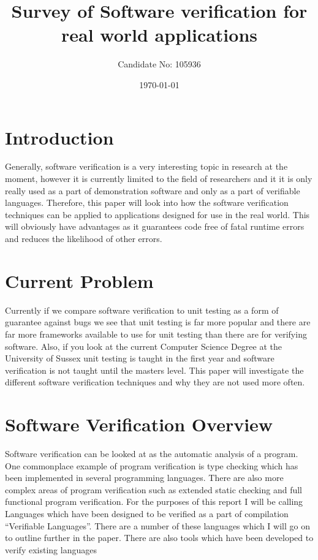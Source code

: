 \documentclass[a4paper,12pt]{scrartcl}
\title{Survey of Software verification for real world applications}
\author{Candidate No: 105936}
\date{\today}
\begin{document}
	
	\begin{titlepage}
		\maketitle
	\end{titlepage}
	
	\tableofcontents
	\newpage
	\section{Introduction}
	{
		Generally, software verification is a very interesting topic in research at the moment, however it is currently limited to the field of researchers and it it is only really used as a part of demonstration software and only as a part of verifiable languages. Therefore, this paper will look into how the software verification techniques can be applied to applications designed for use in the real world. This will obviously have advantages as it guarantees code free of fatal runtime errors and reduces the likelihood of other errors.
	}

	\section{Current Problem}
	{
		Currently if we compare software verification to unit testing as a form of guarantee against bugs we see that unit testing is far more popular and there are far more frameworks available to use for unit testing than there are for verifying software. Also, if you look at the current Computer Science Degree at the University of Sussex unit testing is taught in the first year and software verification is not taught until the masters level. This paper will investigate the different software verification techniques and why they are not used more often.
	}

	\section{Software Verification Overview}
	{
		Software verification can be looked at as the automatic analysis of a program. One commonplace example of program verification is type checking which has been implemented in several programming languages. There are also more complex areas of program verification such as extended static checking and full functional program verification. For the purposes of this report I will be calling Languages which have been designed to be verified as a part of compilation \enquote{Verifiable Languages}. There are a number of these languages which I will go on to outline further in the paper. There are also tools which have been developed to verify existing languages
	}
	
\end{document}
